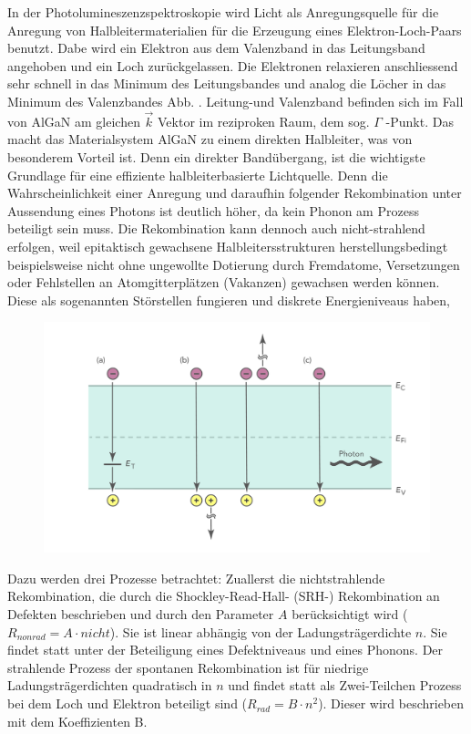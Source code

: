 \raggedright
%
In der Photolumineszenzspektroskopie wird Licht als Anregungsquelle für die Anregung von Halbleitermaterialien für die Erzeugung eines Elektron-Loch-Paars benutzt. Dabe wird ein Elektron aus dem Valenzband in das Leitungsband angehoben und ein Loch zurückgelassen. Die Elektronen relaxieren anschliessend sehr schnell in das Minimum des Leitungsbandes und analog die Löcher in das Minimum des Valenzbandes Abb. . Leitung-und Valenzband befinden sich im Fall von AlGaN am gleichen $\vec{k}$ Vektor im reziproken Raum, dem sog. $\Gamma$ -Punkt. Das macht das Materialsystem AlGaN zu einem direkten Halbleiter, was von besonderem Vorteil ist. Denn ein direkter Bandübergang, ist die wichtigste Grundlage für eine effiziente halbleiterbasierte Lichtquelle. Denn die Wahrscheinlichkeit einer Anregung und daraufhin folgender Rekombination unter Aussendung eines Photons ist deutlich höher, da kein Phonon am Prozess beteiligt sein muss. 
Die Rekombination kann dennoch auch nicht-strahlend erfolgen, weil epitaktisch gewachsene Halbleitersstrukturen herstellungsbedingt beispielsweise nicht ohne ungewollte Dotierung durch Fremdatome, Versetzungen oder Fehlstellen an Atomgitterplätzen (Vakanzen) gewachsen werden können. Diese als sogenannten Störstellen fungieren und diskrete Energieniveaus haben, 
%
\begin{figure}[h]
    \centering
    \begin{minipage}[t]{0.5\linewidth}
        \centering
        \includegraphics[width=\linewidth]{Bilder/rekbomChannels.pdf}
        \caption{}
        \label{fig:rekombChannels}
    \end{minipage}%
\end{figure}
\raggedright
%
Dazu werden drei Prozesse betrachtet: Zuallerst die nichtstrahlende Rekombination, die durch die Shockley-Read-Hall- (SRH-) Rekombination an Defekten beschrieben und durch den Parameter $A$ berücksichtigt wird ($R_{nonrad} = A \cdot nicht $). Sie ist linear abhängig von der Ladungsträgerdichte $n$. Sie findet statt unter der Beteiligung eines Defektniveaus und eines Phonons. Der strahlende Prozess der spontanen Rekombination ist für niedrige Ladungsträgerdichten quadratisch in $n$ und findet statt als Zwei-Teilchen Prozess bei dem Loch und Elektron beteiligt sind ($R_{rad} = B \cdot n^2 $). Dieser wird beschrieben mit dem Koeffizienten B. 
